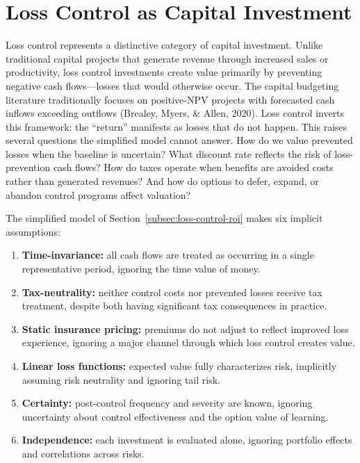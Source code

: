 \documentclass[11pt,openany]{book}
\providecommand{\tightlist}{\setlength{\itemsep}{0pt}\setlength{\parskip}{0pt}}
\begin{document}
\section{Loss Control as Capital Investment}
\label{sec:appendix-capital}

Loss control represents a distinctive category of capital investment. Unlike
traditional capital projects that generate revenue through increased sales or
productivity, loss control investments create value primarily by preventing
negative cash flows---losses that would otherwise occur. The capital budgeting
literature traditionally focuses on positive-NPV projects with forecasted cash
inflows exceeding outflows (Brealey, Myers, \& Allen, 2020). Loss control
inverts this framework: the ``return'' manifests as losses that do not happen.
This raises several questions the simplified model cannot answer. How do we
value prevented losses when the baseline is uncertain? What discount rate
reflects the risk of loss-prevention cash flows? How do taxes operate when
benefits are avoided costs rather than generated revenues? And how do options
to defer, expand, or abandon control programs affect valuation?

The simplified model of Section~\ref{subsec:loss-control-roi} makes six
implicit assumptions:

\begin{enumerate}\tightlist
  \item \textbf{Time-invariance:} all cash flows are treated as occurring in a
        single representative period, ignoring the time value of money.
  \item \textbf{Tax-neutrality:} neither control costs nor prevented losses
        receive tax treatment, despite both having significant tax
        consequences in practice.
  \item \textbf{Static insurance pricing:} premiums do not adjust to reflect
        improved loss experience, ignoring a major channel through which loss
        control creates value.
  \item \textbf{Linear loss functions:} expected value fully characterizes
        risk, implicitly assuming risk neutrality and ignoring tail risk.
  \item \textbf{Certainty:} post-control frequency and severity are known,
        ignoring uncertainty about control effectiveness and the option value
        of learning.
  \item \textbf{Independence:} each investment is evaluated alone, ignoring
        portfolio effects and correlations across risks.
\end{enumerate}
\end{document}
